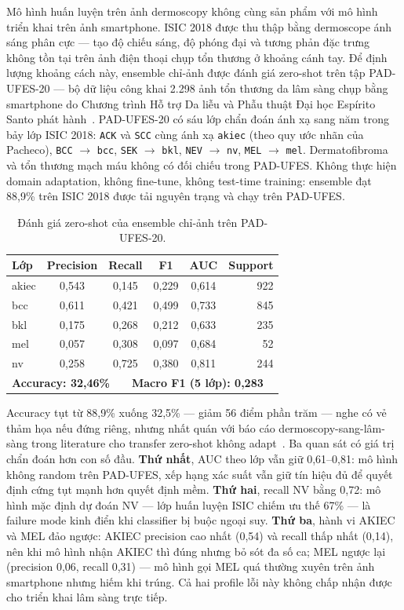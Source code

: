 Mô hình huấn luyện trên ảnh dermoscopy không cùng sản phẩm với mô hình triển khai trên ảnh smartphone. ISIC 2018 được thu thập bằng dermoscope ánh sáng phân cực --- tạo độ chiếu sáng, độ phóng đại và tương phản đặc trưng không tồn tại trên ảnh điện thoại chụp tổn thương ở khoảng cánh tay. Để định lượng khoảng cách này, ensemble chỉ-ảnh được đánh giá zero-shot trên tập PAD-UFES-20 --- bộ dữ liệu công khai 2.298 ảnh tổn thương da lâm sàng chụp bằng smartphone do Chương trình Hỗ trợ Da liễu và Phẫu thuật Đại học Espírito Santo phát hành~\cite{pacheco2020pad}. PAD-UFES-20 có sáu lớp chẩn đoán ánh xạ sang năm trong bảy lớp ISIC 2018: \texttt{ACK} và \texttt{SCC} cùng ánh xạ \texttt{akiec} (theo quy ước nhãn của Pacheco), \texttt{BCC} $\to$ \texttt{bcc}, \texttt{SEK} $\to$ \texttt{bkl}, \texttt{NEV} $\to$ \texttt{nv}, \texttt{MEL} $\to$ \texttt{mel}. Dermatofibroma và tổn thương mạch máu không có đối chiếu trong PAD-UFES. Không thực hiện domain adaptation, không fine-tune, không test-time training: ensemble đạt 88,9\% trên ISIC 2018 được tải nguyên trạng và chạy trên PAD-UFES.

\begin{table}[H]
\centering
\caption{Đánh giá zero-shot của ensemble chỉ-ảnh trên PAD-UFES-20.}
\label{tab:ood_pad_ufes_vn}
\begin{tabular}{lccccr}
\toprule
\textbf{Lớp} & \textbf{Precision} & \textbf{Recall} & \textbf{F1} & \textbf{AUC} & \textbf{Support} \\
\midrule
akiec & 0,543 & 0,145 & 0,229 & 0,614 & 922 \\
bcc   & 0,611 & 0,421 & 0,499 & 0,733 & 845 \\
bkl   & 0,175 & 0,268 & 0,212 & 0,633 & 235 \\
mel   & 0,057 & 0,308 & 0,097 & 0,684 &  52 \\
nv    & 0,258 & 0,725 & 0,380 & 0,811 & 244 \\
\midrule
\multicolumn{6}{l}{\textbf{Accuracy: 32,46\%}~~~~\textbf{Macro F1 (5 lớp): 0,283}} \\
\bottomrule
\end{tabular}
\end{table}

Accuracy tụt từ 88,9\% xuống 32,5\% --- giảm 56 điểm phần trăm --- nghe có vẻ thảm họa nếu đứng riêng, nhưng nhất quán với báo cáo dermoscopy-sang-lâm-sàng trong literature cho transfer zero-shot không adapt~\cite{pacheco2020metadata}. Ba quan sát có giá trị chẩn đoán hơn con số đầu. \textbf{Thứ nhất}, AUC theo lớp vẫn giữ 0,61--0,81: mô hình không random trên PAD-UFES, xếp hạng xác suất vẫn giữ tín hiệu đủ để quyết định cứng tụt mạnh hơn quyết định mềm. \textbf{Thứ hai}, recall NV bằng 0,72: mô hình mặc định dự đoán NV --- lớp huấn luyện ISIC chiếm ưu thế 67\% --- là failure mode kinh điển khi classifier bị buộc ngoại suy. \textbf{Thứ ba}, hành vi AKIEC và MEL đảo ngược: AKIEC precision cao nhất (0,54) và recall thấp nhất (0,14), nên khi mô hình nhận AKIEC thì đúng nhưng bỏ sót đa số ca; MEL ngược lại (precision 0,06, recall 0,31) --- mô hình gọi MEL quá thường xuyên trên ảnh smartphone nhưng hiếm khi trúng. Cả hai profile lỗi này không chấp nhận được cho triển khai lâm sàng trực tiếp.


